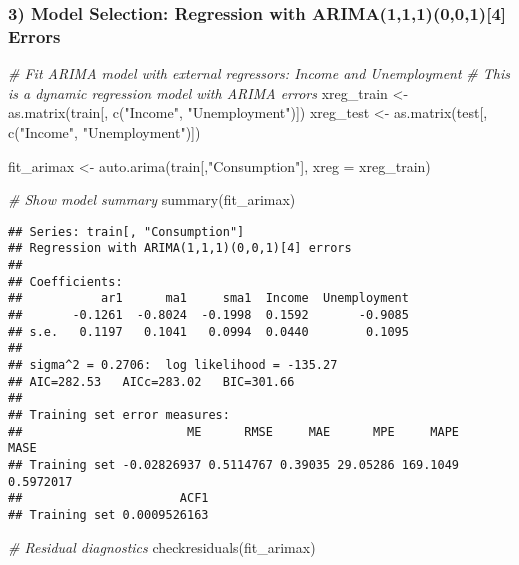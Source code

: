 \documentclass[
  12pt,
]{article}
\newenvironment{Shaded}{\begin{snugshade}}{\end{snugshade}}
\newcommand{\AttributeTok}[1]{\textcolor[rgb]{0.77,0.63,0.00}{#1}}
\newcommand{\CommentTok}[1]{\textcolor[rgb]{0.56,0.35,0.01}{\textit{#1}}}
\newcommand{\FunctionTok}[1]{\textcolor[rgb]{0.00,0.00,0.00}{#1}}
\newcommand{\NormalTok}[1]{#1}
\newcommand{\OtherTok}[1]{\textcolor[rgb]{0.56,0.35,0.01}{#1}}
\newcommand{\StringTok}[1]{\textcolor[rgb]{0.31,0.60,0.02}{#1}}
\begin{document}
\hypertarget{model-selection-regression-with-arima1110014-errors}{%
\subsubsection{3) Model Selection: Regression with
ARIMA(1,1,1)(0,0,1){[}4{]}
Errors}\label{model-selection-regression-with-arima1110014-errors}}

\begin{Shaded}
\begin{Highlighting}[]
\CommentTok{\# Fit ARIMA model with external regressors: Income and Unemployment}
\CommentTok{\# This is a dynamic regression model with ARIMA errors}
\NormalTok{xreg\_train }\OtherTok{\textless{}{-}} \FunctionTok{as.matrix}\NormalTok{(train[, }\FunctionTok{c}\NormalTok{(}\StringTok{"Income"}\NormalTok{, }\StringTok{"Unemployment"}\NormalTok{)])}
\NormalTok{xreg\_test }\OtherTok{\textless{}{-}} \FunctionTok{as.matrix}\NormalTok{(test[, }\FunctionTok{c}\NormalTok{(}\StringTok{"Income"}\NormalTok{, }\StringTok{"Unemployment"}\NormalTok{)])}

\NormalTok{fit\_arimax }\OtherTok{\textless{}{-}} \FunctionTok{auto.arima}\NormalTok{(train[,}\StringTok{"Consumption"}\NormalTok{], }\AttributeTok{xreg =}\NormalTok{ xreg\_train)}

\CommentTok{\# Show model summary}
\FunctionTok{summary}\NormalTok{(fit\_arimax)}
\end{Highlighting}
\end{Shaded}

\begin{verbatim}
## Series: train[, "Consumption"] 
## Regression with ARIMA(1,1,1)(0,0,1)[4] errors 
## 
## Coefficients:
##           ar1      ma1     sma1  Income  Unemployment
##       -0.1261  -0.8024  -0.1998  0.1592       -0.9085
## s.e.   0.1197   0.1041   0.0994  0.0440        0.1095
## 
## sigma^2 = 0.2706:  log likelihood = -135.27
## AIC=282.53   AICc=283.02   BIC=301.66
## 
## Training set error measures:
##                       ME      RMSE     MAE      MPE     MAPE      MASE
## Training set -0.02826937 0.5114767 0.39035 29.05286 169.1049 0.5972017
##                      ACF1
## Training set 0.0009526163
\end{verbatim}

\begin{Shaded}
\begin{Highlighting}[]
\CommentTok{\# Residual diagnostics}
\FunctionTok{checkresiduals}\NormalTok{(fit\_arimax)}
\end{Highlighting}
\end{Shaded}
\end{document}
